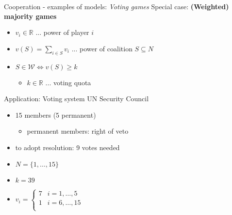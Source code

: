 \documentclass{beamer}
\begin{document}
\begin{frame}{Cooperation - examples of models: \textit{Voting games}}
    Special case: \textbf{(Weighted) majority games}
    \begin{itemize}
        \pause
        \item $v_i \in \mathbb{R}$ ... power of player $i$
        \pause
        \item $v(S) = \sum_{i \in S}v_i$ ... power of coalition $S \subseteq N$
        \pause
        \item $S \in \mathcal{W} \iff v(S) \geq k$
        \begin{itemize}
            \item $k \in \mathbb{R}$ ... voting quota
        \end{itemize} 
    \end{itemize}
    \pause
    Application: Voting system UN Security Council
    \pause
    \begin{itemize}
        \item 15 members (5 permanent)
        \pause
        \begin{itemize}
            \item permanent members: right of veto
        \end{itemize}
        \pause
        \item to adopt resolution: 9 votes needed
    \end{itemize}
    \begin{itemize}
        \pause
        \item $N = \{1,\dots,15\}$
        \pause
        \item $k=39$
        \pause
        \item $v_i = \begin{cases}
            7 & i=1,\dots,5\\
            1 & i=6,\dots,15\\
            \end{cases}$
    \end{itemize}
\end{frame}



\end{document}

